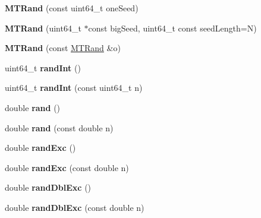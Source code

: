 \begin{DoxyCompactItemize}
\item 
\hypertarget{classMTRand_a60104c123a240826273baafe99238c9f}{{\bfseries M\-T\-Rand} (const uint64\-\_\-t one\-Seed)}\label{classMTRand_a60104c123a240826273baafe99238c9f}

\item 
\hypertarget{classMTRand_a8e6fe5b4b8a3e07cc32530854dd114ec}{{\bfseries M\-T\-Rand} (uint64\-\_\-t $\ast$const big\-Seed, uint64\-\_\-t const seed\-Length=N)}\label{classMTRand_a8e6fe5b4b8a3e07cc32530854dd114ec}

\item 
\hypertarget{classMTRand_aff69d4a4ec88475bab03a295e8fb0f60}{{\bfseries M\-T\-Rand} (const \hyperlink{classMTRand}{M\-T\-Rand} \&o)}\label{classMTRand_aff69d4a4ec88475bab03a295e8fb0f60}

\item 
\hypertarget{classMTRand_ad36da78bd8155920a5cb7d85eaae0ade}{uint64\-\_\-t {\bfseries rand\-Int} ()}\label{classMTRand_ad36da78bd8155920a5cb7d85eaae0ade}

\item 
\hypertarget{classMTRand_a7b291ee28dbc624ca2d411f19c41d3e9}{uint64\-\_\-t {\bfseries rand\-Int} (const uint64\-\_\-t n)}\label{classMTRand_a7b291ee28dbc624ca2d411f19c41d3e9}

\item 
\hypertarget{classMTRand_a76d129a2d850c24ff4a0613f299cf3a5}{double {\bfseries rand} ()}\label{classMTRand_a76d129a2d850c24ff4a0613f299cf3a5}

\item 
\hypertarget{classMTRand_aa4fe82fc27fd81414ce7554093a9766b}{double {\bfseries rand} (const double n)}\label{classMTRand_aa4fe82fc27fd81414ce7554093a9766b}

\item 
\hypertarget{classMTRand_afd05e468983b3a3d66ce0f403bd666af}{double {\bfseries rand\-Exc} ()}\label{classMTRand_afd05e468983b3a3d66ce0f403bd666af}

\item 
\hypertarget{classMTRand_aa1e89d6c7ac8737567b3ccf8fe70b6de}{double {\bfseries rand\-Exc} (const double n)}\label{classMTRand_aa1e89d6c7ac8737567b3ccf8fe70b6de}

\item 
\hypertarget{classMTRand_a4d3a475aa72fe6d1a6d7d9e16d6a732e}{double {\bfseries rand\-Dbl\-Exc} ()}\label{classMTRand_a4d3a475aa72fe6d1a6d7d9e16d6a732e}

\item 
\hypertarget{classMTRand_a1a81d8f00de8f553d4b8626d64e1c544}{double {\bfseries rand\-Dbl\-Exc} (const double n)}\label{classMTRand_a1a81d8f00de8f553d4b8626d64e1c544}


\end{DoxyCompactItemize}
